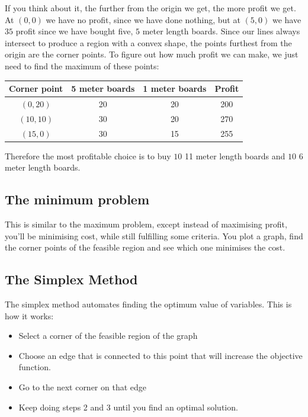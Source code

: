 If you think about it, the further from the origin we get, the more profit we
get. At $(0,0)$ we have no profit, since we have done nothing, but at $(5,0)$ we
have $35$ profit since we have bought five, $5$ meter length boards. Since our
lines always intersect to produce a region with a convex shape, the points
furthest from the origin are the corner points. To figure out how much profit we
can make, we just need to find the maximum of these points:

\begin{center}
  \begin{tabular}{c | c | c | c}
    \textbf{Corner point} & \textbf{5 meter boards} & \textbf{1 meter boards}
      & \textbf{Profit}\\  \hline
    $(0,20)$  & 20 & 20 & 200\\ \hline
    $(10,10)$ & 30 & 20 & 270\\ \hline
    $(15,0)$  & 30 & 15 & 255\\
  \end{tabular}
\end{center}

Therefore the most profitable choice is to buy $10$ 11 meter length boards and
$10$ 6 meter length boards.

\subsection{The minimum problem}

This is similar to the maximum problem, except instead of maximising profit,
you'll be minimising cost, while still fulfilling some criteria. You plot a
graph, find the corner points of the feasible region and see which one minimises
the cost.


\subsection{The Simplex Method}

The simplex method automates finding the optimum value of variables. This is
how it works:

\begin{itemize}
  \item Select a corner of the feasible region of the graph
  \item Choose an edge that is connected to this point that will increase the
  objective function.
  \item Go to the next corner on that edge
  \item Keep doing steps 2 and 3 until you find an optimal solution.
\end{itemize}

